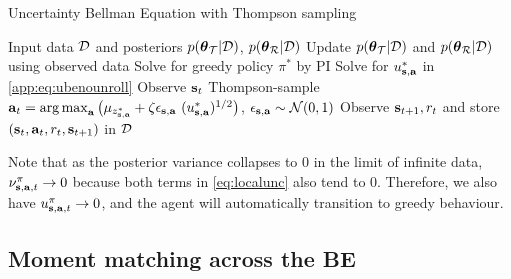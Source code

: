 \documentclass{article}
\begin{document}
\begin{appendices}
\begin{algorithm}
  \caption{Uncertainty Bellman Equation with Thompson sampling}
  \begin{algorithmic}[1]\label{ube:algo}
\State Input data $\mathcal{D}$ and posteriors $p(\boldsymbol{\theta}_{\mathcal{T}} | \mathcal{D})$, $p(\boldsymbol{\theta}_{\mathcal{R}} | \mathcal{D})$
	\State Update $p(\boldsymbol{\theta}_{\mathcal{T}} | \mathcal{D})$ and $p(\boldsymbol{\theta}_{\mathcal{R}} | \mathcal{D})$ using observed data
	\State Solve for greedy policy ${\pi^*}$ by PI
	\State Solve for $u_{\mathbf{s}, \mathbf{a}}^*$ in \cref{app:eq:ubenounroll}
	\EndIf
 	\State Observe $\mathbf{s}_t$
	\State Thompson-sample $\mathbf{a}_t = \operatorname*{arg\,max}_{\mathbf{a}} \big(\mu_{z^*_{\mathbf{s}, \mathbf{a}}} + \zeta \epsilon_{\mathbf{s}, \mathbf{a}}~(u_{\mathbf{s}, \mathbf{a}}^*)^{1/2}\big)$, $\epsilon_{\mathbf{s}, \mathbf{a}} \sim \mathcal{N}(0, 1)$
	\State Observe $\mathbf{s}_{t+1}, r_{t}$ and store $(\mathbf{s}_{t}, \mathbf{a}_t, r_{t}, \mathbf{s}_{t+1})$ in $\mathcal{D}$
\EndFor
\end{algorithmic}
\end{algorithm}

\noindent Note that as the posterior variance collapses to 0 in the limit of infinite data, $\nu^{\pi}_{\mathbf{s}, \mathbf{a}, t} \to 0$ because both terms in \cref{eq:localunc} also tend to 0. Therefore, we also have $u_{\mathbf{s}, \mathbf{a}, t}^\pi \to 0$, and the agent will automatically transition to greedy behaviour.

\subsection{Moment matching across the BE}\label{app:mm}


\end{appendices}
\end{document}
